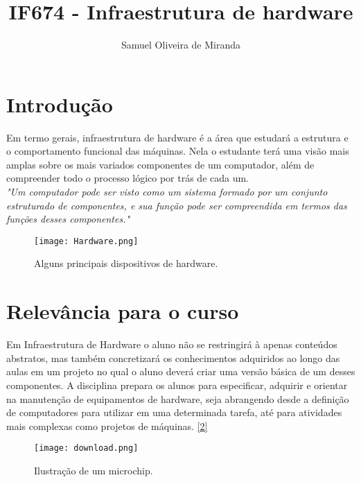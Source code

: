 \documentclass[a4paper,10]{article}
\title{IF674 - Infraestrutura de hardware}
\author{Samuel Oliveira de Miranda}
\begin{document}
\maketitle



\section{Introdução}

Em termo gerais, infraestrutura de hardware é a área que estudará a estrutura e o comportamento funcional das máquinas. Nela o estudante terá uma visão mais amplas sobre os mais variados componentes de um computador, além de compreender todo o processo lógico por trás de cada um. 
\\
\textit{ "Um computador pode ser visto como um sistema formado por um conjunto estruturado de
componentes, e sua função pode ser compreendida em termos das funções desses componentes."
\cite{Stalling}}

\begin{figure}[h]
\centering
\texttt{[image: Hardware.png]}
\caption{\label{fig:PC}Alguns principais dispositivos de hardware.}
\end{figure}


\section{Relevância para o curso}

Em Infraestrutura de Hardware o aluno não se restringirá à apenas conteúdos abstratos, mas também concretizará os conhecimentos adquiridos ao longo das aulas em um projeto no qual o aluno deverá criar uma versão básica de um desses componentes. A disciplina prepara os alunos para especificar, adquirir e orientar na manutenção de equipamentos de hardware, seja abrangendo desde a definição de computadores para utilizar em uma determinada tarefa, até para atividades mais complexas como projetos de máquinas.  \href{http://www.cin.ufpe.br/~if674/Objetivo.html}{[2]} 

\begin{figure}[h]
\texttt{[image: download.png]}
\centering
\caption{\label{fig:PC}Ilustração de um microchip.}
\end{figure}
\end{document}
